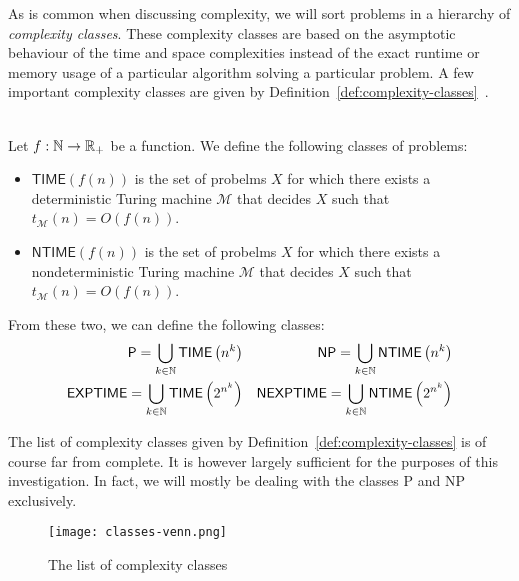 As is common when discussing complexity, we will sort problems in a hierarchy of \emph{complexity classes}. These complexity classes are based on the asymptotic behaviour of the time and space complexities instead of the exact runtime or memory usage of a particular algorithm solving a particular problem. A few important complexity classes are given by Definition~\ref{def:complexity-classes}~\cite{langages-formels}.

\begin{definition}\ \\
    \label{def:complexity-classes}
    Let \(f: \mathbb{N} \rightarrow \mathbb{R}_+\) be a function. We define the following classes of problems:
    \begin{itemize}
        \item \(\textsf{TIME}(f(n))\) is the set of probelms \(X\) for which there exists a deterministic Turing machine \(\mathcal{M}\) that decides \(X\) such that \(t_{\mathcal{M}}(n) = O(f(n))\).
        \item 
        \(\textsf{NTIME}(f(n))\) is the set of probelms \(X\) for which there exists a nondeterministic Turing machine \(\mathcal{M}\) that decides \(X\) such that \(t_{\mathcal{M}}(n) = O(f(n))\).    
    \end{itemize}
    From these two, we can define the following classes:
    \begin{align*}
        \textsf{P} = \bigcup\limits_{k\in\mathbb{N}} \textsf{TIME}\left(n^k\right)& &
        \textsf{NP} = \bigcup\limits_{k\in\mathbb{N}} \textsf{NTIME}\left(n^k\right) \\
        \textsf{EXPTIME} = \bigcup\limits_{k\in\mathbb{N}} \textsf{TIME}\left(2^{n^k}\right) & &
        \textsf{NEXPTIME} = \bigcup\limits_{k\in\mathbb{N}} \textsf{NTIME}\left(2^{n^k}\right) \\
    \end{align*}
\end{definition}

The list of complexity classes given by Definition~\ref{def:complexity-classes} is of course far from complete. It is however largely sufficient for the purposes of this investigation. In fact, we will mostly be dealing with the classes \textsf{P} and \textsf{NP} exclusively.


\begin{figure}
    \begin{center}
       \texttt{[image: classes-venn.png]}
    \end{center}
    \caption{The list of complexity classes}
\end{figure}


